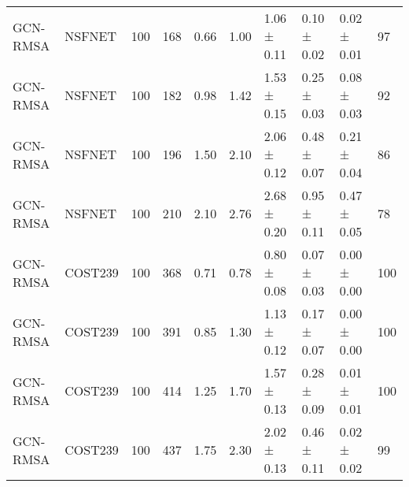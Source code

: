 \begin{longtable}[!htbp]{llll|lllll|l}
GCN-RMSA             & NSFNET            & 100                  & 168                                                               & 0.66 & \multicolumn{1}{l|}{1.00}       & 1.06 ± 0.11 & 0.10 ± 0.02      & 0.02 ± 0.01                  & 97                                                                                    \\
GCN-RMSA             & NSFNET            & 100                  & 182                                                               & 0.98 & \multicolumn{1}{l|}{1.42}    & 1.53 ± 0.15 & 0.25 ± 0.03      & 0.08 ± 0.03                  & 92                                                                                    \\
GCN-RMSA             & NSFNET            & 100                  & 196                                                               & 1.50  & \multicolumn{1}{l|}{2.10}     & 2.06 ± 0.12 & 0.48 ± 0.07      & 0.21 ± 0.04                  & 86                                                                                    \\
GCN-RMSA             & NSFNET            & 100                  & 210                                                               & 2.10  & \multicolumn{1}{l|}{2.76}    & 2.68 ± 0.20 & 0.95 ± 0.11      & 0.47 ± 0.05                  & 78                                                                                    \\
GCN-RMSA             & COST239           & 100                  & 368                                                               & 0.71 & \multicolumn{1}{l|}{0.78}    & 0.80 ± 0.08 & 0.07 ± 0.03      & 0.00 ± 0.00                  & 100                                                                                    \\
GCN-RMSA             & COST239           & 100                  & 391                                                               & 0.85 & \multicolumn{1}{l|}{1.30}     & 1.13 ± 0.12    & 0.17 ± 0.07      & 0.00 ± 0.00                  & 100                                                                                    \\
GCN-RMSA             & COST239           & 100                  & 414                                                               & 1.25 & \multicolumn{1}{l|}{1.70}     & 1.57 ± 0.13 & 0.28 ± 0.09      & 0.01 ± 0.01                  & 100                                                                                    \\
GCN-RMSA             & COST239           & 100                  & 437                                                               & 1.75 & \multicolumn{1}{l|}{2.30}     & 2.02 ± 0.13 & 0.46 ± 0.11      & 0.02 ± 0.02                  & 99                                                                                    \\

\end{longtable}
